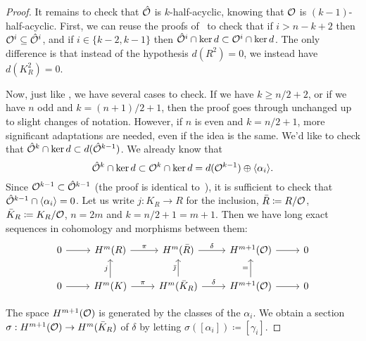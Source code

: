 \begin{proof}
  It remains to check that $\hat{\mathcal{O}}$ is $k$-half-acyclic, knowing that $\mathcal{O}$ is $(k-1)$-half-acyclic.
  First, we can reuse the proofs of~\cite[Lemmas~5.2 and~5.3]{LambrechtsStanley2008} to check that if $i > n-k+2$ then $\mathcal{O}^{i} \subseteq \hat{\mathcal{O}}^{i}$, and if $i \in \{ k-2, k-1 \}$ then $\hat{\mathcal{O}}^{i} \cap \ker d \subset \mathcal{O}^{i} \cap \ker d$.
  The only difference is that instead of the hypothesis $d(R^{2}) = 0$, we instead have $d(K_{R}^{2}) = 0$.

  Now, just like \cite{LambrechtsStanley2008}, we have several cases to check.
  If we have $k \geq n/2 + 2$, or if we have $n$ odd and $k = (n+1)/2 + 1$, then the proof goes through unchanged up to slight changes of notation.
  However, if $n$ is even and $k = n/2 + 1$, more significant adaptations are needed, even if the idea is the same.
  We'd like to check that $\hat{\mathcal{O}}^{k} \cap \ker d \subset d(\hat{\mathcal{O}}^{k-1})$.
  We already know that
  \begin{equation}
    \hat{\mathcal{O}}^{k} \cap \ker d \subset \mathcal{O}^{k} \cap \ker d = d(\mathcal{O}^{k-1}) \oplus \langle \alpha_{i} \rangle.
  \end{equation}
  Since $\mathcal{O}^{k-1} \subset \hat{\mathcal{O}}^{k-1}$ (the proof is identical to~\cite[Lemma~5.7]{LambrechtsStanley2008}), it is sufficient to check that $\hat{\mathcal{O}}^{k-1} \cap \langle \alpha_{i} \rangle = 0$.
  Let us write $j : K_{R} \to R$ for the inclusion, $\bar{R} \coloneqq R / \mathcal{O}$, $\bar{K}_{R} \coloneqq K_{R} / \mathcal{O}$, $n = 2m$ and $k = n/2 + 1 = m + 1$.
  Then we have long exact sequences in cohomology and morphisms between them:
  \begin{equation}
    \begin{tikzcd}
      0 \rar
      & H^{m}(R) \rar{\pi}
      & H^{m}(\bar{R}) \rar{\delta}
      & H^{m+1}(\OO) \rar
      & 0
      \\
      0 \rar
      & H^{m}(K) \rar{\pi} \uar{j}
      & H^{m}(\bar{K}_{R}) \rar{\delta} \uar{\bar{\jmath}}
      & H^{m+1}(\OO) \rar \uar{=}
      & 0
    \end{tikzcd}
  \end{equation}

  The space $H^{m+1}(\mathcal{O})$ is generated by the classes of the $\alpha_{i}$.
  We obtain a section $\sigma : H^{m+1}(\mathcal{O}) \to H^{m}(\bar{K}_{R})$ of $\delta$ by letting $\sigma([\alpha_{i}]) \coloneqq [\gamma_{i}]$.


\end{proof}
